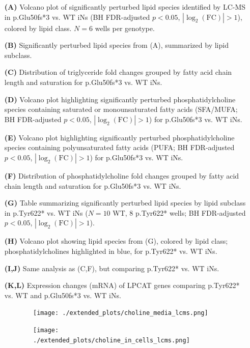 \documentclass[12pt]{article}
\begin{document}
\begin{itemize}
    \item[\textbf{(A)}] Volcano plot of significantly perturbed lipid species identified by LC-MS in p.Glu50fs*3 vs. WT iNs (BH FDR-adjusted $p<0.05$, $|\log_2(\text{FC})|>1$), colored by lipid class. $N=6$ wells per genotype.
    \item[\textbf{(B)}] Significantly perturbed lipid species from (A), summarized by lipid subclass.
    \item[\textbf{(C)}] Distribution of triglyceride fold changes grouped by fatty acid chain length and saturation for p.Glu50fs*3 vs. WT iNs.
    \item[\textbf{(D)}] Volcano plot highlighting significantly perturbed phosphatidylcholine species containing saturated or monounsaturated fatty acids (SFA/MUFA; BH FDR-adjusted $p<0.05$, $|\log_2(\text{FC})|>1$) for p.Glu50fs*3 vs. WT iNs.
    \item[\textbf{(E)}] Volcano plot highlighting significantly perturbed phosphatidylcholine species containing polyunsaturated fatty acids (PUFA; BH FDR-adjusted $p<0.05$, $|\log_2(\text{FC})|>1$) for p.Glu50fs*3 vs. WT iNs.
    \item[\textbf{(F)}] Distribution of phosphatidylcholine fold changes grouped by fatty acid chain length and saturation for p.Glu50fs*3 vs. WT iNs.
    \item[\textbf{(G)}] Table summarizing significantly perturbed lipid species by lipid subclass in p.Tyr622* vs. WT iNs ($N=10$ WT, $8$ p.Tyr622* wells; BH FDR-adjusted $p<0.05$, $|\log_2(\text{FC})|>1$).
    \item[\textbf{(H)}] Volcano plot showing lipid species from (G), colored by lipid class; phosphatidylcholines highlighted in blue, for p.Tyr622* vs. WT iNs.
    \item[\textbf{(I,J)}] Same analysis as (C,F), but comparing p.Tyr622* vs. WT iNs.
    \item[\textbf{(K,L)}] Expression changes (mRNA) of LPCAT genes comparing p.Tyr622* vs. WT and p.Glu50fs*3 vs. WT iNs.
\end{itemize} \begin{figure}[H]
\begin{subfigure}[t]{.7\textwidth}
        \caption{}
        \texttt{[image: ./extended\_plots/choline\_media\_lcms.png]}        
    \end{subfigure}
    \begin{subfigure}[t]{.3\textwidth}
        \caption{}
        \texttt{[image: ./extended\_plots/choline\_in\_cells\_lcms.png]}        

\end{subfigure}
\end{figure}
\end{document}
